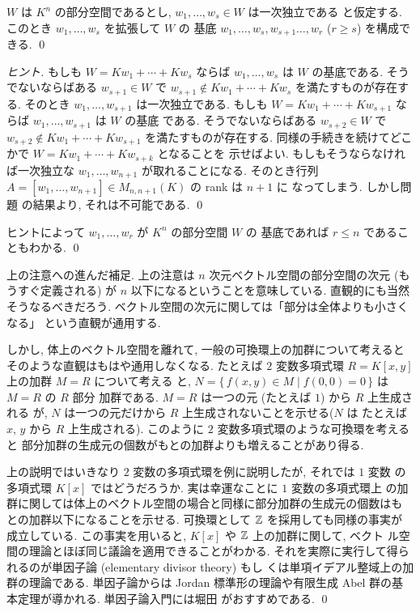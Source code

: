 \documentclass[12pt,twoside]{jarticle}
\begin{document}

\begin{question}[部分空間の基底の存在]
  \label{q:W-basis}
  $W$ は $K^n$ の部分空間であるとし, $w_1,\ldots,w_s\in W$ は一次独立である
  と仮定する.  このとき $w_1,\ldots,w_s$ を拡張して $W$ の
  基底 $w_1,\ldots,w_s,w_{s+1}\ldots,w_r$ ($r\ge s$) を構成できる.
  \qed
\end{question}

\begin{proof}[ヒント]
  もしも $W=Kw_1+\cdots+Kw_s$ ならば $w_1,\ldots,w_s$ は $W$ の基底である.
  そうでないならばある $w_{s+1}\in W$ 
  で $w_{s+1}\not\in Kw_1+\cdots+Kw_s$ を満たすものが存在する.
  そのとき $w_1,\ldots,w_{s+1}$ は一次独立である.
  もしも $W=Kw_1+\cdots+Kw_{s+1}$ ならば $w_1,\ldots,w_{s+1}$ は $W$ の基底
  である. 
  そうでないならばある $w_{s+2}\in W$ 
  で $w_{s+2}\not\in Kw_1+\cdots+Kw_{s+1}$ を満たすものが存在する.
  同様の手続きを続けてどこかで $W=Kw_1+\cdots+Kw_{s+k}$ となることを
  示せばよい.  
  もしもそうならなければ一次独立な $w_1,\ldots,w_{n+1}$ が取れることになる.
  そのとき行列 $A=[w_1,\ldots,w_{n+1}]\in M_{n,n+1}(K)$ の rank は $n+1$ に
  なってしまう.  しかし問題  の結果より, それは不可能である.
  \qed
\end{proof}

\begin{rem}
  ヒントによって $w_1,\ldots,w_r$ が $K^n$ の部分空間 $W$ の
  基底であれば $r\le n$ であることもわかる. 
  \qed
\end{rem}

\begin{guide}
  上の注意への進んだ補足.
  上の注意は $n$ 次元ベクトル空間の部分空間の次元 (もうすぐ定義される) 
  が $n$ 以下になるということを意味している.
  直観的にも当然そうなるべきだろう.
  ベクトル空間の次元に関しては「部分は全体よりも小さくなる」
  という直観が通用する.

  しかし, 体上のベクトル空間を離れて, 一般の可換環上の加群について考えると
  そのような直観はもはや通用しなくなる.  
  たとえば $2$ 変数多項式環 $R=K[x,y]$ 上の加群 $M=R$ について考える
  と, $N = \{\, f(x,y) \in M \mid f(0,0)=0 \,\}$ は $M=R$ の $R$ 部分
  加群である.  $M=R$ は一つの元 (たとえば $1$) から $R$ 上生成される
  が, $N$ は一つの元だけから $R$ 上生成されないことを示せる($N$ は
  たとえば $x$, $y$ から $R$ 上生成される).
  このように $2$ 変数多項式環のような可換環を考えると
  部分加群の生成元の個数がもとの加群よりも増えることがあり得る.

  上の説明ではいきなり $2$ 変数の多項式環を例に説明したが, それでは $1$ 変数
  の多項式環 $K[x]$ ではどうだろうか.  実は幸運なことに $1$ 変数の多項式環上
  の加群に関しては体上のベクトル空間の場合と同様に部分加群の生成元の個数はも
  との加群以下になることを示せる. 可換環として ${\mathbb Z}$ を採用しても同様の事実が
  成立している. この事実を用いると, $K[x]$ や ${\mathbb Z}$ 上の加群に関して, ベクト
  ル空間の理論とほぼ同じ議論を適用できることがわかる.
  それを実際に実行して得られるのが単因子論 (elementary divisor theory) もし
  くは単項イデアル整域上の加群の理論である. 
  単因子論からは Jordan 標準形の理論や有限生成 Abel 群の基本定理が導かれる.
  単因子論入門には堀田 \cite{10wa} がおすすめである.
  \qed
\end{guide}
\end{document}
